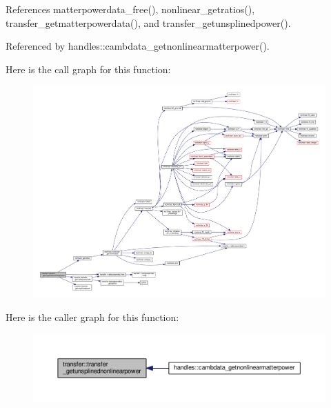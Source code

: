 References matterpowerdata\+\_\+free(), nonlinear\+\_\+getratios(), transfer\+\_\+getmatterpowerdata(), and transfer\+\_\+getunsplinedpower().



Referenced by handles\+::cambdata\+\_\+getnonlinearmatterpower().

Here is the call graph for this function\+:
\nopagebreak
\begin{figure}[H]
\begin{center}
\leavevmode
\includegraphics[width=350pt]{namespacetransfer_a8690f3749fa31715c7729f1f934b7d91_cgraph}
\end{center}
\end{figure}
Here is the caller graph for this function\+:
\nopagebreak
\begin{figure}[H]
\begin{center}
\leavevmode
\includegraphics[width=350pt]{namespacetransfer_a8690f3749fa31715c7729f1f934b7d91_icgraph}
\end{center}
\end{figure}
\mbox{\label{namespacetransfer_af736a104130d0ba0ffbadfa62d245747}} 
